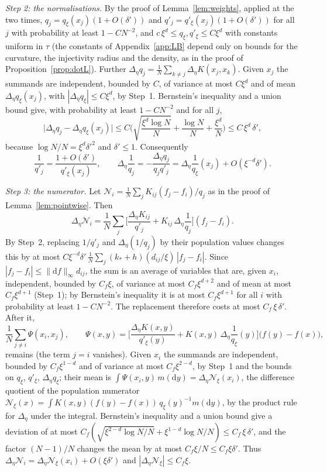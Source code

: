 \documentclass[11pt,a4paper]{article}
\makeatletter
\theoremstyle{stmt}
\theoremstyle{defn}
\theoremstyle{rmk}
\renewenvironment{proof}[1][\proofname]{\par\pushQED{\qed}\normalfont\topsep6\p@\@plus6\p@\relax
  \trivlist\item[\hskip\labelsep{\sffamily\itshape\small #1.}]\ignorespaces}{\popQED\endtrivlist\@endpefalse}
\numberwithin{equation}{section}
\newcommand{\dd}{\mathrm{d}}
\makeatother
\begin{document}
{\begin{proof}
\emph{Step 2: the normalisations.} By the proof of Lemma~\ref{lem:weights}, applied at the two times, $q_j=q_\xi(x_j)(1+O(\delta'))$ and $q'_j=q'_\xi(x_j)(1+O(\delta'))$ for all $j$ with probability at least $1-CN^{-2}$, and $c\,\xi^d\le q_\xi,q'_\xi\le C\xi^d$ with constants uniform in $\tau$ (the constants of Appendix~\ref{app:LB} depend only on bounds for the curvature, the injectivity radius and the density, as in the proof of Proposition~\ref{prop:dotL}). Further $\Delta_\eta q_j=\frac1N\sum_{k\ne j}\Delta_\eta K(x_j,x_k)$. Given $x_j$ the summands are independent, bounded by $C$, of variance at most $C\xi^d$ and of mean $\Delta_\eta q_\xi(x_j)$, with $|\Delta_\eta q_\xi|\le C\xi^d$, by Step~1. Bernstein's inequality and a union bound give, with probability at least $1-CN^{-2}$ and for all $j$,
\[
\big|\Delta_\eta q_j-\Delta_\eta q_\xi(x_j)\big|\le C\Big(\sqrt{\frac{\xi^d\log N}N}+\frac{\log N}N+\frac{\xi^d}N\Big)\le C\,\xi^d\,\delta' ,
\]
because $\log N/N=\xi^d\delta'^2$ and $\delta'\le1$. Consequently
\[
\frac1{q'_j}=\frac{1+O(\delta')}{q'_\xi(x_j)},\qquad\Delta_\eta\frac1{q_j}=-\frac{\Delta_\eta q_j}{q_jq'_j}=\Delta_\eta\frac1{q_\xi}(x_j)+O(\xi^{-d}\delta').
\]

\emph{Step 3: the numerator.} Let $\mathcal N_i=\frac1N\sum_jK_{ij}(f_j-f_i)/q_j$ as in the proof of Lemma~\ref{lem:pointwise}. Then
\[
\Delta_\eta\mathcal N_i=\frac1N\sum_j\Big[\frac{\Delta_\eta K_{ij}}{q'_j}+K_{ij}\,\Delta_\eta\frac1{q_j}\Big](f_j-f_i).
\]
By Step~2, replacing $1/q'_j$ and $\Delta_\eta(1/q_j)$ by their population values changes this by at most $C\xi^{-d}\delta'\,\frac1N\sum_j(k_*+h)(d_{ij}/\xi)\,|f_j-f_i|$. Since $|f_j-f_i|\le\|\dd f\|_\infty d_{ij}$, the sum is an average of variables that are, given $x_i$, independent, bounded by $C_f\xi$, of variance at most $C_f\xi^{d+2}$ and of mean at most $C_f\xi^{d+1}$ (Step~1); by Bernstein's inequality it is at most $C_f\xi^{d+1}$ for all $i$ with probability at least $1-CN^{-2}$. The replacement therefore costs at most $C_f\,\xi\,\delta'$. After it,
\[
\frac1N\sum_{j\ne i}\Psi(x_i,x_j),\qquad\Psi(x,y)=\Big[\frac{\Delta_\eta K(x,y)}{q'_\xi(y)}+K(x,y)\,\Delta_\eta\frac1{q_\xi}(y)\Big]\big(f(y)-f(x)\big),
\]
remains (the term $j=i$ vanishes). Given $x_i$ the summands are independent, bounded by $C_f\xi^{1-d}$ and of variance at most $C_f\xi^{2-d}$, by Step~1 and the bounds on $q_\xi$, $q'_\xi$, $\Delta_\eta q_\xi$; their mean is $\int\Psi(x_i,y)\,m(\dd y)=\Delta_\eta\mathcal N_\xi(x_i)$, the difference quotient of the population numerator $\mathcal N_\xi(x)=\int K(x,y)(f(y)-f(x))\,q_\xi(y)^{-1}m(\dd y)$, by the product rule for $\Delta_\eta$ under the integral. Bernstein's inequality and a union bound give a deviation of at most $C_f(\sqrt{\xi^{2-d}\log N/N}+\xi^{1-d}\log N/N)\le C_f\,\xi\,\delta'$, and the factor $(N-1)/N$ changes the mean by at most $C_f\xi/N\le C_f\xi\delta'$. Thus $\Delta_\eta\mathcal N_i=\Delta_\eta\mathcal N_\xi(x_i)+O(\xi\delta')$ and $|\Delta_\eta\mathcal N_\xi|\le C_f\xi$.


\end{proof}}
\end{document}

